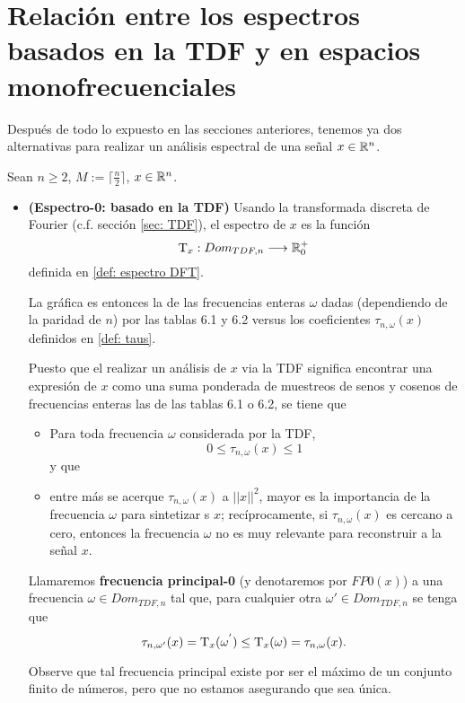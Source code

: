 \section{Relación entre los espectros basados en la TDF y en espacios monofrecuenciales}

Después de todo lo expuesto en las secciones anteriores, tenemos
ya dos alternativas para realizar un análisis
espectral de una señal $x \in \mathbb{R}^{n}$.

Sean $n \geq 2$, $M := \lceil \frac{n}{2} \rceil$, $x \in \mathbb{R}^{n}$.
\begin{itemize}
	\item \textbf{(Espectro-0: basado en la TDF)} 
	Usando la transformada discreta de Fourier
	(c.f. sección \ref{sec: TDF}),
	el espectro de $x$ es la función
	\[
	\mathrm{T}_{x}: Dom_{TDF, n} \longrightarrow \mathbb{R}^{+}_{0}
	\]	
	definida en \ref{def: espectro DFT}.
	
	La gráfica es entonces la de las frecuencias
	enteras $\omega$ dadas (dependiendo de la 
	paridad de $n$) por las
	tablas 6.1 y 6.2
	versus los coeficientes
	$\tau_{n, \omega}(x)$ definidos en
	\ref{def: taus}.
	
	Puesto que el realizar un análisis de 
	$x$ via la TDF significa encontrar una
	expresión de $x$ como una suma
	ponderada de muestreos de senos y cosenos
	de frecuencias enteras las de las tablas 6.1 o 6.2,
	se tiene que  
	\begin{itemize}
		\item Para toda frecuencia $\omega$ considerada
		por la TDF,
		\[
		0 \leq \tau_{n, \omega}(x) \leq 1
		\]
		y que
		\item entre más se acerque
		$\tau_{n, \omega}(x)$
		a $|| x ||^{2}$, mayor es la
		importancia de la frecuencia $\omega$ para
		sintetizar s $x$; recíprocamente, si 
		$\tau_{n, \omega}(x)$ es cercano a cero, entonces
		la frecuencia $\omega$ no es muy relevante para 
		reconstruir a la señal $x$.
	\end{itemize}
	\begin{defi}
	\label{def: FM0}
	Llamaremos \textbf{frecuencia principal-0}
	(y denotaremos por $FP0(x)$) 
	a una 
	frecuencia $\omega \in Dom_{TDF, n}$
	tal que, para cualquier otra $\omega' \in Dom_{TDF, n}$ 
	se tenga que 
	\[
	\tau_{n, \omega'}(x) = \mathrm{T}_{x}(\omega^{'}) \leq
	\mathrm{T}_{x}(\omega) =  
	 \tau_{n, \omega}(x).
	\]
	\end{defi}
	Observe que tal frecuencia principal existe por ser 
	el máximo de un conjunto finito de números, pero que no 
	estamos asegurando que sea única. 
	

\end{itemize}
